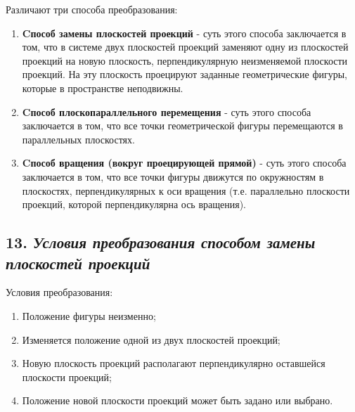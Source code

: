 Различают три способа преобразования:
\begin {enumerate}

\item {\bf Cпособ замены плоскостей проекций} - суть этого способа заключается в том, что в системе двух плоскостей проекций заменяют одну из плоскостей проекций на новую плоскость, перпендикулярную
неизменяемой плоскости проекций. На эту плоскость проецируют заданные
геометрические фигуры, которые в пространстве неподвижны.


\item {\bf Cпособ плоскопараллельного перемещения} - суть этого способа заключается в том, что все точки геометрической фигуры перемещаются в
параллельных плоскостях.


\item {\bf Cпособ вращения (вокруг проецирующей прямой)} - суть этого способа заключается в том, что все точки фигуры движутся по окружностям в плоскостях, перпендикулярных к оси вращения (т.е. параллельно плоскости проекций, которой перпендикулярна ось вращения).


\end {enumerate}




\newpage
\subsection*{13. \textit{Условия преобразования способом замены плоскостей проекций}}

\begin{mainQuote}
    
\end{mainQuote}

Условия преобразования:
\begin{enumerate}
    \item Положение фигуры неизменно;
    \item Изменяется положение одной из двух плоскостей проекций;
    \item Новую плоскость проекций располагают перпендикулярно оставшейся плоскости проекций;
    \item Положение новой плоскости проекций может быть задано или выбрано.
\end{enumerate}

